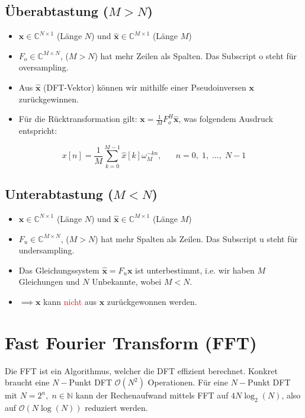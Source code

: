 \documentclass[11pt]{article}
\begin{document}
\vspace*{-0.25cm}
\subsection*{Überabtastung ($M > N$)}
\vspace*{-0.5cm}
\begin{itemize}
    \item $\mathbf{x} \in \mathbb{C}^{N \times 1}$ (Länge $N$) und $\hat{\mathbf{x}} \in \mathbb{C}^{M \times 1}$ (Länge $M$)
    \item $F_o \in \mathbb{C}^{M\times N}$, ($M > N$) hat mehr Zeilen als Spalten. Das Subscript o steht für oversampling.
    \item Aus $\hat{\mathbf{x}}$ (DFT-Vektor) können wir mithilfe einer Pseudoinversen $\mathbf{x}$ zurückgewinnen.
    \item Für die Rücktransformation gilt: $\mathbf{x} = \displaystyle\frac{1}{M} F_o^H \hat{\mathbf{x}}$, was folgendem Ausdruck entspricht:
\end{itemize}
\vspace*{-0.5cm}
$$x[n] = \frac{1}{M} \sum_{k=0}^{M-1} \hat{x}[k]\omega_M^{-kn}, \hspace{20pt} n = 0, \; 1, \; \dots, \; N-1$$

\vspace*{-0.25cm}
\subsection*{Unterabtastung ($M < N$)}
\vspace*{-0.5cm}
\begin{itemize}
    \item $\mathbf{x} \in \mathbb{C}^{N \times 1}$ (Länge $N$) und $\hat{\mathbf{x}} \in \mathbb{C}^{M \times 1}$ (Länge $M$)
    \item $F_u \in \mathbb{C}^{M\times N}$, ($M > N$) hat mehr Spalten als Zeilen. Das Subscript u steht für undersampling.
    \item Das Gleichungssystem $\hat{\mathbf{x}} = F_u \mathbf{x}$ ist unterbestimmt, i.e. wir haben $M$ Gleichungen und $N$ Unbekannte, wobei $M < N$.
    \item[] $\implies \mathbf{x}$ kann \textcolor{red}{nicht} aus $\mathbf{x}$ zurückgewonnen werden.
\end{itemize}


\vfill \null
\pagebreak

\section*{Fast Fourier Transform (FFT)}
\vspace*{-0.5cm}
Die FFT ist ein Algorithmus, welcher die DFT effizient berechnet. Konkret braucht eine $N-$Punkt DFT $\mathcal{O}(N^2)$ Operationen. Für eine $N-$Punkt DFT mit $N=2^n, \; n \in \mathbb{N}$ kann der Rechenaufwand mittels FFT auf $4N \log_2(N)$, also auf $\mathcal{O}(N\log(N))$ reduziert werden.
\end{document}
